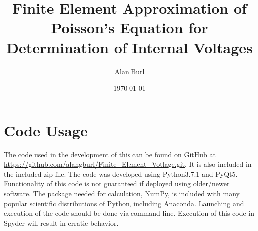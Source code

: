 \documentclass[12pt]{article}
\title{Finite Element Approximation of Poisson's Equation for Determination of Internal Voltages}
\author{Alan Burl}
\date{\today}
\begin{document}
	\maketitle
	\clearpage
	
	
	
	
	\section{Code Usage}
		The code used in the development of this can be found on GitHub at \url{https://github.com/alangburl/Finite_Element_Votlage.git}. It is also included in the included zip file. The code was developed using Python3.7.1 and PyQt5. Functionality of this code is not guaranteed if deployed using older/newer software. The package needed for calculation, NumPy, is included with many popular scientific distributions of Python, including Anaconda. Launching and execution of the code should be done via command line. Execution of this code in Spyder will result in erratic behavior.
\end{document}
